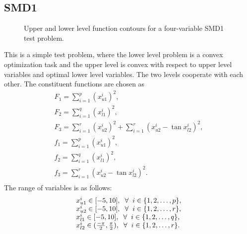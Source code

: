 \documentclass[twoside]{article}
\begin{document}
\subsection{SMD1}

\begin{figure}
\begin{center}
\caption{Upper and lower level function contours for a four-variable SMD1 test problem.}
\label{fig:smd1-2}
\end{center}
\end{figure}

This is a simple test problem, where the lower level problem is a convex optimization task and the upper level is convex with respect to upper level variables and optimal lower level variables. The two levels cooperate with each other. The constituent functions are chosen as
\begin{equation}
\begin{array}{l}
F_1 = \sum_{i=1}^{p} (x_{u1}^{i})^2,\\
F_2 = \sum_{i=1}^{q} (x_{l1}^{i})^2,\\
F_3 = \sum_{i=1}^{r} (x_{u2}^{i})^2 + \sum_{i=1}^{r} (x_{u2}^{i} - \tan x_{l2}^{i})^2,\\
f_1 = \sum_{i=1}^{p} (x_{u1}^{i})^2,\\
f_2 = \sum_{i=1}^{q} (x_{l1}^{i})^2,\\
f_3 = \sum_{i=1}^{r} (x_{u2}^{i} - \tan x_{l2}^{i})^2.\\
\end{array}
\end{equation}
The range of variables is as follows:
\begin{equation}
\begin{array}{l}
x_{u1}^{i} \in [-5,10], \hspace{2mm} \forall \hspace{2mm} i \in \{1,2,\ldots,p\},\\
x_{u2}^{i} \in [-5,10], \hspace{2mm} \forall \hspace{2mm} i \in \{1,2,\ldots,r\},\\
x_{l1}^{i} \in [-5,10], \hspace{2mm} \forall \hspace{2mm} i \in \{1,2,\ldots,q\},\\
x_{l2}^{i} \in (\frac{-\pi}{2},\frac{\pi}{2}), \hspace{2mm} \forall \hspace{2mm} i \in \{1,2,\ldots,r\}.
\end{array}
\end{equation}
\end{document}
